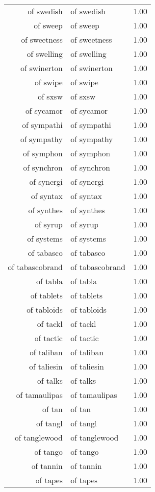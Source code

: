 \begin{table}[ht]
\begin{tabular}{rlr}
  of swedish & of swedish & 1.00 \\ 
  of sweep & of sweep & 1.00 \\ 
  of sweetness & of sweetness & 1.00 \\ 
  of swelling & of swelling & 1.00 \\ 
  of swinerton & of swinerton & 1.00 \\ 
  of swipe & of swipe & 1.00 \\ 
  of sxsw & of sxsw & 1.00 \\ 
  of sycamor & of sycamor & 1.00 \\ 
  of sympathi & of sympathi & 1.00 \\ 
  of sympathy & of sympathy & 1.00 \\ 
  of symphon & of symphon & 1.00 \\ 
  of synchron & of synchron & 1.00 \\ 
  of synergi & of synergi & 1.00 \\ 
  of syntax & of syntax & 1.00 \\ 
  of synthes & of synthes & 1.00 \\ 
  of syrup & of syrup & 1.00 \\ 
  of systems & of systems & 1.00 \\ 
  of tabasco & of tabasco & 1.00 \\ 
  of tabascobrand & of tabascobrand & 1.00 \\ 
  of tabla & of tabla & 1.00 \\ 
  of tablets & of tablets & 1.00 \\ 
  of tabloids & of tabloids & 1.00 \\ 
  of tackl & of tackl & 1.00 \\ 
  of tactic & of tactic & 1.00 \\ 
  of taliban & of taliban & 1.00 \\ 
  of taliesin & of taliesin & 1.00 \\ 
  of talks & of talks & 1.00 \\ 
  of tamaulipas & of tamaulipas & 1.00 \\ 
  of tan & of tan & 1.00 \\ 
  of tangl & of tangl & 1.00 \\ 
  of tanglewood & of tanglewood & 1.00 \\ 
  of tango & of tango & 1.00 \\ 
  of tannin & of tannin & 1.00 \\ 
  of tapes & of tapes & 1.00 \\ 

\end{tabular}
\end{table}
